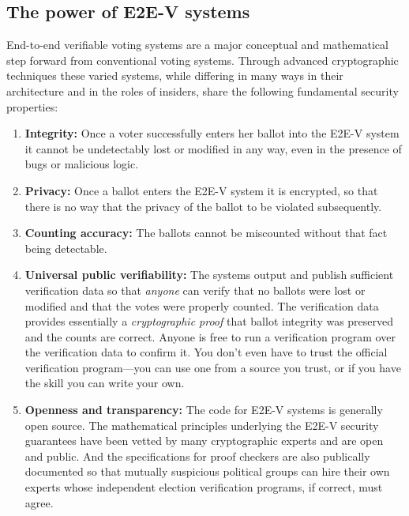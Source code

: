 \subsection{The power of E2E-V systems}

End-to-end verifiable voting systems are a major conceptual and
mathematical step forward from conventional voting systems. Through
advanced cryptographic techniques these varied systems, while
differing in many ways in their architecture and in the roles of
insiders, share the following fundamental security properties:

\begin{enumerate}[label={\alph*})]
\item \textbf{Integrity:} Once a voter successfully enters her ballot
  into the E2E-V system it cannot be undetectably lost or modified in
  any way, even in the presence of bugs or malicious logic.

\item \textbf{Privacy:} Once a ballot enters the E2E-V system it is
  encrypted, so that there is no way that the privacy of the ballot to
  be violated subsequently.

\item \textbf{Counting accuracy:} The ballots cannot be miscounted
  without that fact being detectable.

\item \textbf{Universal public verifiability:} The systems output and
  publish sufficient verification data so that \emph{anyone} can
  verify that no ballots were lost or modified and that the votes were
  properly counted. The verification data provides essentially a
  \emph{cryptographic proof} that ballot integrity was preserved and
  the counts are correct. Anyone is free to run a verification program
  over the verification data to confirm it. You don't even have to
  trust the official verification program---you can use one from a
  source you trust, or if you have the skill you can write your own.

\item \textbf{Openness and transparency:} The code for E2E-V systems
  is generally open source. The mathematical principles underlying the
  E2E-V security guarantees have been vetted by many cryptographic
  experts and are open and public. And the specifications for proof
  checkers are also publically documented so that mutually suspicious
  political groups can hire their own experts whose independent
  election verification programs, if correct, must agree.
\end{enumerate}

